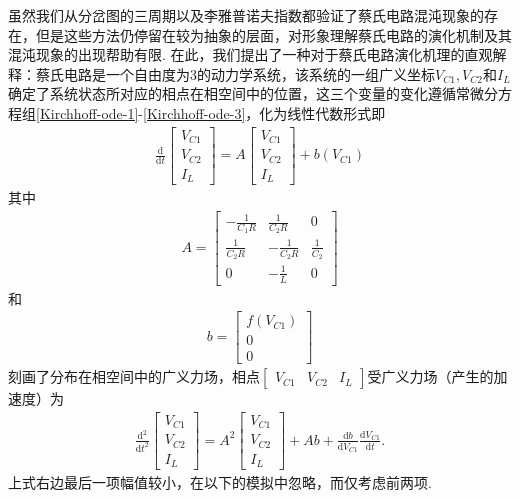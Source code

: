 \documentclass[a4paper, 10pt]{article}
\begin{document}
\begin{multicols*}{2}
虽然我们从分岔图的三周期以及李雅普诺夫指数都验证了蔡氏电路混沌现象的存在，但是这些方法仍停留在较为抽象的层面，对形象理解蔡氏电路的演化机制及其混沌现象的出现帮助有限. 在此，我们提出了一种对于蔡氏电路演化机理的直观解释：蔡氏电路是一个自由度为$3$的动力学系统，该系统的一组广义坐标$V_{C1},V_{C2}$和$I_L$确定了系统状态所对应的相点在相空间中的位置，这三个变量的变化遵循常微分方程组\eqref{Kirchhoff-ode-1}-\eqref{Kirchhoff-ode-3}，化为线性代数形式即
\begin{align}
    \frac{\mathrm{d}}{\mathrm{d}t}\left[\begin{matrix}
        V_{C1}\\
        V_{C2}\\
        I_L
    \end{matrix}\right]=A\left[\begin{matrix}
        V_{C1}\\
        V_{C2}\\
        I_L
    \end{matrix}\right]+b(V_{C1})
\end{align}
其中
\begin{align}
    A=\left[\begin{matrix}
        -\frac{1}{C_1R}&\frac{1}{C_2R}&0\\
        \frac{1}{C_2R}&-\frac{1}{C_2R}&\frac{1}{C_2}\\
        0&-\frac{1}{L}&0
    \end{matrix}\right]
\end{align}
和
\begin{align}
    b=\left[\begin{matrix}
        f(V_{C1})\\
        0\\
        0
    \end{matrix}\right]
\end{align}
刻画了分布在相空间中的广义力场，相点$[\begin{smallmatrix}
    V_{C1}&V_{C2}&I_L
\end{smallmatrix}]$受广义力场（产生的加速度）为
\begin{align}
    \frac{\mathrm{d}^2}{\mathrm{d}t^2}\left[\begin{matrix}
        V_{C1}\\
        V_{C2}\\
        I_L
    \end{matrix}\right]=A^2\left[\begin{matrix}
        V_{C1}\\
        V_{C2}\\
        I_L
    \end{matrix}\right]+Ab+\frac{\mathrm{d}b}{\mathrm{d}V_{C1}}\frac{\mathrm{d}V_{C1}}{\mathrm{d}t}.
\end{align}
上式右边最后一项幅值较小，在以下的模拟中忽略，而仅考虑前两项.


\end{multicols*}
\end{document}
